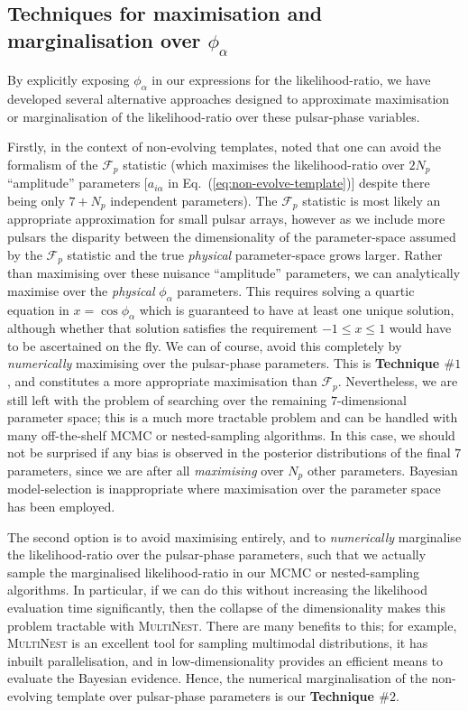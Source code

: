 \documentclass[twocolappendix,tighten]{emulateapj}
\begin{document}
\subsection{Techniques for maximisation and marginalisation over $\phi_{\alpha}$}

By explicitly exposing $\phi_{\alpha}$ in our expressions for the likelihood-ratio, we have developed several alternative approaches designed to approximate maximisation or marginalisation of the likelihood-ratio over these pulsar-phase variables. 

Firstly, in the context of non-evolving templates, \citet{ellisoptimal2012} noted that one can avoid the formalism of the $\mathcal{F}_p$ statistic (which maximises the likelihood-ratio over $2N_{p}$ ``amplitude'' parameters [$a_{i\alpha}$ in Eq.\ (\ref{eq:non-evolve-template})] despite there being only $7+N_{p}$ independent parameters). The $\mathcal{F}_p$ statistic is most likely an appropriate approximation for small pulsar arrays, however as we include more pulsars the disparity between the dimensionality of the parameter-space assumed by the $\mathcal{F}_p$ statistic and the true {\it physical} parameter-space grows larger. Rather than maximising over these nuisance ``amplitude'' parameters, we can analytically maximise over the {\it physical} $\phi_{\alpha}$ parameters. This requires solving a quartic equation in $x=\cos\phi_{\alpha}$ which is guaranteed to have at least one unique solution, although whether that solution satisfies the requirement $-1 \leq x \leq 1$ would have to be ascertained on the fly. We can of course, avoid this completely by \textit{numerically} maximising over the pulsar-phase parameters. This is {\bf Technique $\#1$}, and constitutes a more appropriate maximisation than $\mathcal{F}_p$. Nevertheless, we are still left with the problem of searching over the remaining $7$-dimensional parameter space; this is a much more tractable problem and can be handled with many off-the-shelf MCMC or nested-sampling algorithms. In this case, we should not be surprised if any bias is observed in the posterior distributions of the final $7$ parameters, since we are after all \textit{maximising} over $N_p$ other parameters. Bayesian model-selection is inappropriate where maximisation over the parameter space has been employed.

The second option is to avoid maximising entirely, and to \textit{numerically} marginalise the likelihood-ratio over the pulsar-phase parameters, such that we actually sample the marginalised likelihood-ratio in our MCMC or nested-sampling algorithms. In particular, if we can do this without increasing the likelihood evaluation time significantly, then the collapse of the dimensionality makes this problem tractable with \textsc{MultiNest}. There are many benefits to this; for example, \textsc{MultiNest} is an excellent tool for sampling multimodal distributions, it has inbuilt parallelisation, and in low-dimensionality provides an efficient means to evaluate the Bayesian evidence. Hence, the numerical marginalisation of the non-evolving template over pulsar-phase parameters is our {\bf Technique $\#2$}.
\end{document}
